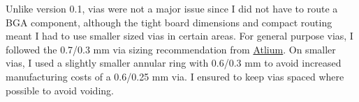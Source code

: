 Unlike version 0.1, vias were not a major issue since I did not have to route a BGA component, although the tight board dimensions and compact routing meant I had to use smaller sized vias in certain areas.
For general purpose vias, I followed the 0.7/0.3 mm via sizing recommendation from \href{https://resources.altium.com/p/vias-101}{Atlium}.
On smaller vias, I used a slightly smaller annular ring with 0.6/0.3 mm to avoid increased manufacturing costs of a 0.6/0.25 mm via.
I ensured to keep vias spaced where possible to avoid voiding.